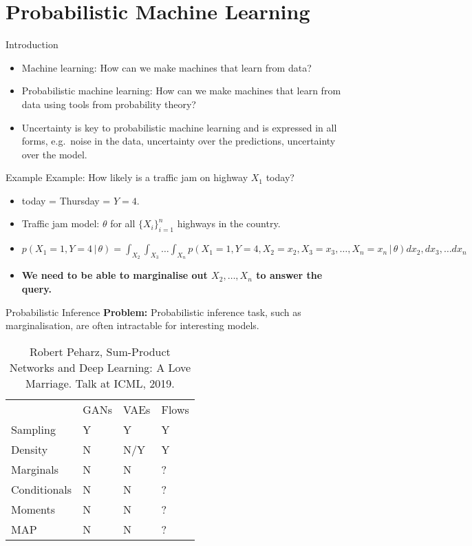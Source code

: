 \section{Probabilistic Machine Learning}

\begin{frame}{Introduction}
\begin{itemize}
    \item Machine learning: How can we make machines that learn from data?
    \item Probabilistic machine learning: How can we make machines that learn from data using tools from probability theory?
    \item Uncertainty is key to probabilistic machine learning and is expressed in all forms, e.g.~noise in the data, uncertainty over the predictions, uncertainty over the model.
\end{itemize}
\end{frame}

\begin{frame}{Example}
Example: How likely is a traffic jam on highway $X_1$ today?

\begin{itemize}
    \item today = Thursday = $Y = 4$.
    \item Traffic jam model: $\theta$ for all $\{X_i\}_{i=1}^n$ highways in the country.
    \item $p(X_1 = 1, Y = 4 \,|\, \theta) = \int_{X_2} \int_{X_3} \dots \int_{X_n} p(X_1 = 1, Y = 4, X_2 = x_2, X_3 = x_3, \dots, X_n = x_n \, | \, \theta) dx_2, dx_3, \dots dx_n$
    \item \textbf{We need to be able to marginalise out $X_2, \dots, X_n$ to answer the query.}
\end{itemize}
\end{frame}

\begin{frame}{Probabilistic Inference}
    \textbf{Problem:} Probabilistic inference task, such as marginalisation, are often intractable for interesting models.

\begin{table}
\centering
\begin{tabular}{llll}
             & GANs & VAEs & Flows  \\
Sampling     & Y    & Y    & Y          \\
Density      & N    & N/Y  & Y           \\
Marginals    & N    & N    & ?           \\
Conditionals & N    & N    & ?           \\
Moments      & N    & N    & ?           \\
MAP          & N    & N    & ?
\end{tabular}
\caption{\scriptsize Robert Peharz, Sum-Product Networks and Deep Learning: A Love Marriage. Talk at ICML, 2019.}
\end{table}
\end{frame}
